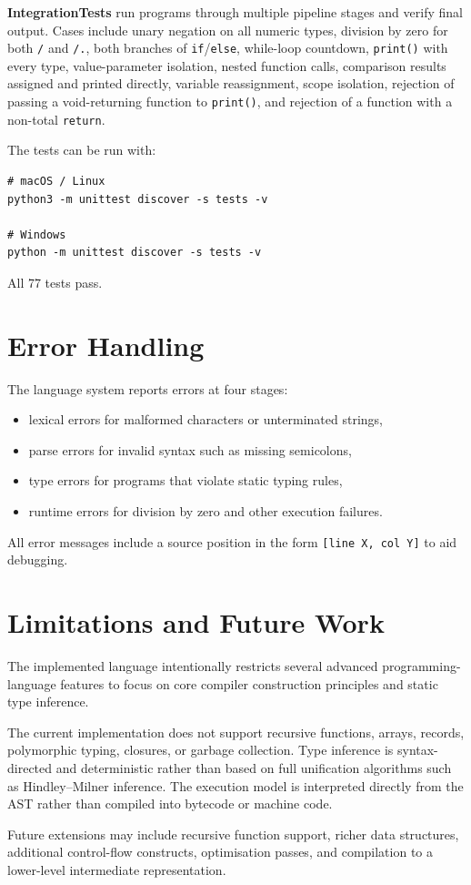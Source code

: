 \noindent\textbf{IntegrationTests} run programs through multiple pipeline
stages and verify final output. Cases include unary negation on all numeric
types, division by zero for both \texttt{/} and \texttt{/.}, both branches of
\texttt{if}/\texttt{else}, while-loop countdown, \texttt{print()} with every
type, value-parameter isolation, nested function calls, comparison results
assigned and printed directly, variable reassignment, scope isolation, rejection
of passing a void-returning function to \texttt{print()}, and rejection of a
function with a non-total \texttt{return}.

The tests can be run with:

\begin{lstlisting}
# macOS / Linux
python3 -m unittest discover -s tests -v

# Windows
python -m unittest discover -s tests -v
\end{lstlisting}

All 77 tests pass.

\section{Error Handling}
The language system reports errors at four stages:

\begin{itemize}
	\item lexical errors for malformed characters or unterminated strings,
	\item parse errors for invalid syntax such as missing semicolons,
	\item type errors for programs that violate static typing rules,
	\item runtime errors for division by zero and other execution failures.
\end{itemize}

All error messages include a source position in the form
\texttt{[line~X, col~Y]} to aid debugging.

\section{Limitations and Future Work}
The implemented language intentionally restricts several advanced
programming-language features to focus on core compiler construction
principles and static type inference.

The current implementation does not support recursive functions, arrays,
records, polymorphic typing, closures, or garbage collection. Type inference
is syntax-directed and deterministic rather than based on full unification
algorithms such as Hindley--Milner inference. The execution model is
interpreted directly from the AST rather than compiled into bytecode or
machine code.

Future extensions may include recursive function support, richer data
structures, additional control-flow constructs, optimisation passes, and
compilation to a lower-level intermediate representation.
